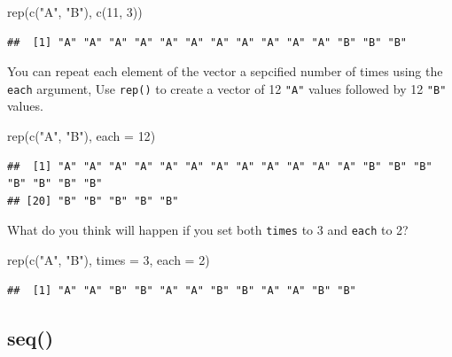 \documentclass[
  oneside]{book}
\newenvironment{Shaded}{\begin{snugshade}}{\end{snugshade}}
\newcommand{\AttributeTok}[1]{\textcolor[rgb]{0.77,0.63,0.00}{#1}}
\newcommand{\DecValTok}[1]{\textcolor[rgb]{0.00,0.00,0.81}{#1}}
\newcommand{\FunctionTok}[1]{\textcolor[rgb]{0.00,0.00,0.00}{#1}}
\newcommand{\NormalTok}[1]{#1}
\newcommand{\StringTok}[1]{\textcolor[rgb]{0.31,0.60,0.02}{#1}}
\begin{document}
\begin{Shaded}
\begin{Highlighting}[]
\FunctionTok{rep}\NormalTok{(}\FunctionTok{c}\NormalTok{(}\StringTok{"A"}\NormalTok{, }\StringTok{"B"}\NormalTok{), }\FunctionTok{c}\NormalTok{(}\DecValTok{11}\NormalTok{, }\DecValTok{3}\NormalTok{))}
\end{Highlighting}
\end{Shaded}

\begin{verbatim}
##  [1] "A" "A" "A" "A" "A" "A" "A" "A" "A" "A" "A" "B" "B" "B"
\end{verbatim}

You can repeat each element of the vector a sepcified number of times using the \texttt{each} argument, Use \texttt{rep()} to create a vector of 12 \texttt{"A"} values followed by 12 \texttt{"B"} values.

\begin{Shaded}
\begin{Highlighting}[]
\FunctionTok{rep}\NormalTok{(}\FunctionTok{c}\NormalTok{(}\StringTok{"A"}\NormalTok{, }\StringTok{"B"}\NormalTok{), }\AttributeTok{each =} \DecValTok{12}\NormalTok{)}
\end{Highlighting}
\end{Shaded}

\begin{verbatim}
##  [1] "A" "A" "A" "A" "A" "A" "A" "A" "A" "A" "A" "A" "B" "B" "B" "B" "B" "B" "B"
## [20] "B" "B" "B" "B" "B"
\end{verbatim}

What do you think will happen if you set both \texttt{times} to 3 and \texttt{each} to 2?

\begin{Shaded}
\begin{Highlighting}[]
\FunctionTok{rep}\NormalTok{(}\FunctionTok{c}\NormalTok{(}\StringTok{"A"}\NormalTok{, }\StringTok{"B"}\NormalTok{), }\AttributeTok{times =} \DecValTok{3}\NormalTok{, }\AttributeTok{each =} \DecValTok{2}\NormalTok{)}
\end{Highlighting}
\end{Shaded}

\begin{verbatim}
##  [1] "A" "A" "B" "B" "A" "A" "B" "B" "A" "A" "B" "B"
\end{verbatim}

\hypertarget{seq}{%
\subsection{seq()}\label{seq}}
\end{document}
